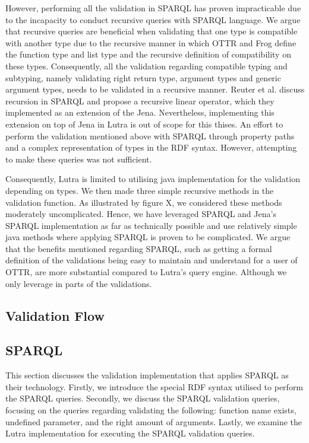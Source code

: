 \para
However, performing all the validation in SPARQL has proven impracticable due to the incapacity to conduct recursive queries with SPARQL language\cite[711]{RecursionSPARQL}. We argue that recursive queries are beneficial when validating that one type is compatible with another type due to the recursive manner in which OTTR and Frog define the function type and list type and the recursive definition of compatibility on these types. Consequently, all the validation regarding compatible typing and subtyping, namely validating right return type, argument types and generic argument types, needs to be validated in a recursive manner. Reuter et al. discuss recursion in SPARQL and propose a recursive linear operator, which they implemented as an extension of the Jena\cite[732]{RecursionSPARQL}. Nevertheless, implementing this extension on top of Jena in Lutra is out of scope for this thises. An effort to perform the validation mentioned above with SPARQL through property paths and a complex representation of types in the RDF syntax. However, attempting to make these queries was not sufficient. 

\para
Consequently, Lutra is limited to utilising java implementation for the validation depending on types. We then made three simple recursive methods in the validation function. As illustrated by figure X, we considered these methods moderately uncomplicated. Hence, we have leveraged SPARQL and Jena's SPARQL implementation as far as technically possible and use relatively simple java methods where applying SPARQL is proven to be complicated. We argue that the benefits mentioned regarding SPARQL, such as getting a formal definition of the validations being easy to maintain and understand for a user of OTTR, are more substantial compared to Lutra's query engine. Although we only leverage in parts of the validations. 

\subsection{Validation Flow}

\subsection{SPARQL}
This section discusses the validation implementation that applies SPARQL as their technology. Firstly, we introduce the special RDF syntax utilised to perform the SPARQL queries. Secondly, we discuss the SPARQL validation queries, focusing on the queries regarding validating the following: function name exists, undefined parameter, and the right amount of arguments. Lastly, we examine the Lutra implementation for executing the SPARQL validation queries. 

